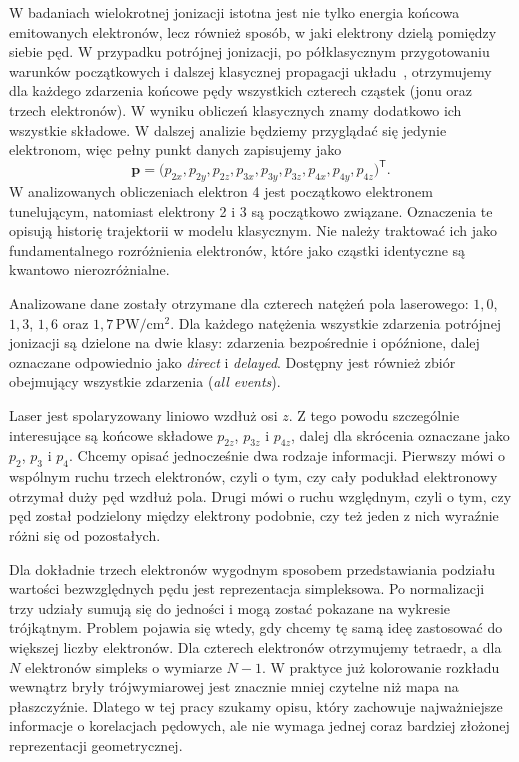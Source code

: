 \documentclass[12pt,letterpaper,oneside]{report}
\numberwithin{equation}{chapter}
\numberwithin{figure}{chapter}
\numberwithin{table}{chapter}
\newcommand{\direct}{\textit{direct}}
\newcommand{\delayed}{\textit{delayed}}
\begin{document}
W badaniach wielokrotnej jonizacji istotna jest nie tylko energia końcowa emitowanych elektronów, lecz również sposób, w jaki elektrony dzielą pomiędzy siebie pęd. W przypadku potrójnej jonizacji, po półklasycznym przygotowaniu warunków
początkowych i dalszej klasycznej propagacji układu~\cite{Emmanouilidou2023}, otrzymujemy dla
każdego zdarzenia końcowe pędy wszystkich czterech cząstek (jonu oraz
trzech elektronów). W wyniku obliczeń klasycznych znamy dodatkowo ich wszystkie składowe. W dalszej analizie będziemy przyglądać się jedynie elektronom, więc pełny punkt danych zapisujemy jako
\begin{equation}
\mathbf p=
\bigl(p_{2x},p_{2y},p_{2z},p_{3x},p_{3y},p_{3z},p_{4x},p_{4y},p_{4z}\bigr)^{\mathsf T}.
\label{eq:data-vector}
\end{equation}
W analizowanych obliczeniach elektron 4 jest początkowo elektronem tunelującym, natomiast elektrony 2 i 3 są początkowo związane. Oznaczenia te opisują historię trajektorii w modelu klasycznym. Nie należy traktować ich jako fundamentalnego rozróżnienia elektronów, które jako cząstki identyczne są kwantowo nierozróżnialne.

Analizowane dane zostały otrzymane dla czterech natężeń pola laserowego:
\(1{,}0\), \(1{,}3\), \(1{,}6\) oraz \(1{,}7\,\mathrm{PW/cm^2}\).
Dla każdego natężenia wszystkie zdarzenia potrójnej jonizacji są
dzielone na dwie klasy: zdarzenia bezpośrednie i opóźnione, dalej
oznaczane odpowiednio jako \direct{} i \delayed{}. Dostępny jest również
zbiór obejmujący wszystkie zdarzenia (\textit{all events}).

Laser jest spolaryzowany liniowo wzdłuż osi $z$. Z tego powodu szczególnie interesujące są końcowe składowe $p_{2z}$, $p_{3z}$ i $p_{4z}$, dalej dla skrócenia oznaczane jako $p_2$, $p_3$ i $p_4$. Chcemy opisać jednocześnie dwa rodzaje informacji. Pierwszy mówi o wspólnym ruchu trzech elektronów, czyli o tym, czy cały podukład elektronowy otrzymał duży pęd wzdłuż pola. Drugi mówi o ruchu względnym, czyli o tym, czy pęd został podzielony między elektrony podobnie, czy też jeden z nich wyraźnie różni się od pozostałych.

Dla dokładnie trzech elektronów wygodnym sposobem przedstawiania podziału wartości bezwzględnych pędu jest reprezentacja simpleksowa. Po normalizacji trzy udziały sumują się do jedności i mogą zostać pokazane na wykresie trójkątnym. Problem pojawia się wtedy, gdy chcemy tę samą ideę zastosować do większej liczby elektronów. Dla czterech elektronów otrzymujemy tetraedr, a dla $N$ elektronów simpleks o wymiarze $N-1$. W praktyce już kolorowanie rozkładu wewnątrz bryły trójwymiarowej jest znacznie mniej czytelne niż mapa na płaszczyźnie. Dlatego w tej pracy szukamy opisu, który zachowuje najważniejsze informacje o korelacjach pędowych, ale nie wymaga jednej coraz bardziej złożonej reprezentacji geometrycznej.
\end{document}
